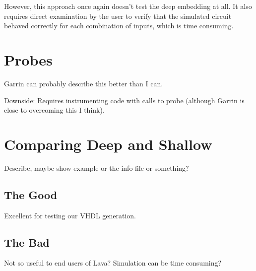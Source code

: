 \documentclass{llncs}
\begin{document}
However, this approach once again doesn't test the deep embedding at all.
It also requires direct examination by the user to verify that the
simulated circuit behaved correctly for each combination of inputs, which
is time consuming.

\section{Probes}

Garrin can probably describe this better than I can.

Downside: Requires instrumenting code with calls to probe (although Garrin is close to
overcoming this I think). 

\section{Comparing Deep and Shallow}

Describe, maybe show example or the info file or something?

\subsection{The Good}

Excellent for testing our VHDL generation.

\subsection{The Bad}

Not so useful to end users of Lava? Simulation can be time consuming?

\end{document}
